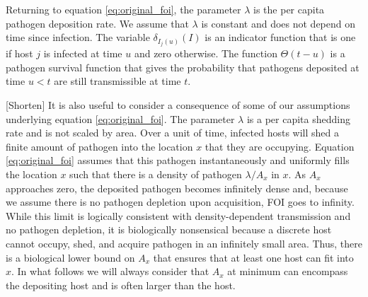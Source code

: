 \documentclass[letterpaper]{article}
\begin{document}
Returning to equation \ref{eq:original_foi}, the parameter $\lambda$ is the per capita pathogen deposition rate. We assume that $\lambda$ is constant and does not depend on time since infection. The variable  $\delta_{I_j(u)}(I)$ is an indicator function that is one if host $j$ is infected at time $u$ and zero otherwise.  The function $\Theta(t - u)$ is a pathogen survival function that gives the probability that pathogens deposited at time $u < t$ are still transmissible at time $t$.  

[Shorten] It is also useful to consider a consequence of some of our assumptions underlying equation \ref{eq:original_foi}. The parameter $\lambda$ is a per capita shedding rate and is not scaled by area. Over a unit of time, infected hosts will shed a finite amount of pathogen into the location $x$ that they are occupying.  Equation \ref{eq:original_foi} assumes that this pathogen instantaneously and uniformly fills the location $x$ such that there is a density of pathogen $\lambda / A_x$ in $x$. %
As $A_x$ approaches zero, the deposited pathogen becomes infinitely dense and, because we assume there is no pathogen depletion upon acquisition, FOI goes to infinity.  While this limit is logically consistent with density-dependent transmission and no pathogen depletion, it is biologically nonsensical because a discrete host cannot occupy, shed, and acquire pathogen in an infinitely small area. Thus, there is a biological lower bound on $A_x$ that ensures that at least one host can fit into $x$.  %
In what follows we will always consider that $A_x$ at minimum can encompass the depositing host and is often larger than the host.

\end{document}
